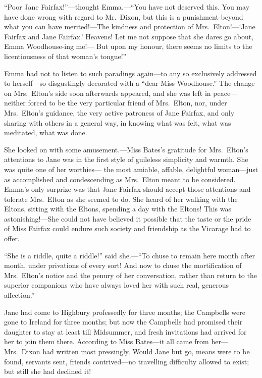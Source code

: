 ``Poor Jane Fairfax!''---thought Emma.---``You have not deserved this.
You may have done wrong with regard to Mr.\ Dixon, but this is a
punishment beyond what you can have merited!---The kindness and protection
of Mrs.\ Elton!---`Jane Fairfax and Jane Fairfax.'  Heavens!  Let me
not suppose that she dares go about, Emma Woodhouse-ing me!---%
But upon my honour, there seems no limits to the licentiousness
of that woman's tongue!''

Emma had not to listen to such paradings again---to any so exclusively
addressed to herself---so disgustingly decorated with a ``dear Miss
Woodhouse.''  The change on Mrs.\ Elton's side soon afterwards appeared,
and she was left in peace---neither forced to be the very particular
friend of Mrs.\ Elton, nor, under Mrs.\ Elton's guidance, the very
active patroness of Jane Fairfax, and only sharing with others in a
general way, in knowing what was felt, what was meditated, what was done.

She looked on with some amusement.---Miss Bates's gratitude for
Mrs.\ Elton's attentions to Jane was in the first style of guileless
simplicity and warmth.  She was quite one of her worthies---%
the most amiable, affable, delightful woman---just as accomplished
and condescending as Mrs.\ Elton meant to be considered.
Emma's only surprize was that Jane Fairfax should accept
those attentions and tolerate Mrs.\ Elton as she seemed to do.
She heard of her walking with the Eltons, sitting with the Eltons,
spending a day with the Eltons!  This was astonishing!---She could not
have believed it possible that the taste or the pride of Miss Fairfax
could endure such society and friendship as the Vicarage had to offer.

``She is a riddle, quite a riddle!'' said she.---``To chuse to remain
here month after month, under privations of every sort!  And now
to chuse the mortification of Mrs.\ Elton's notice and the penury
of her conversation, rather than return to the superior companions
who have always loved her with such real, generous affection.''

Jane had come to Highbury professedly for three months; the Campbells
were gone to Ireland for three months; but now the Campbells
had promised their daughter to stay at least till Midsummer,
and fresh invitations had arrived for her to join them there.
According to Miss Bates---it all came from her---Mrs.\ Dixon had
written most pressingly.  Would Jane but go, means were to be found,
servants sent, friends contrived---no travelling difficulty allowed
to exist; but still she had declined it!

